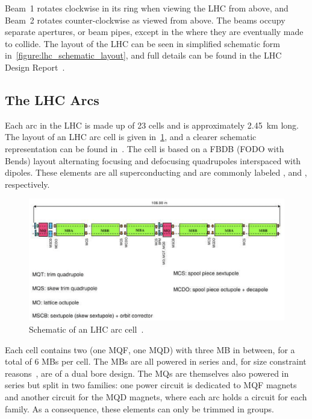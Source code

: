 Beam~\num{1} rotates clockwise in its ring when viewing the LHC from above, and Beam~\num{2} rotates counter-clockwise as viewed from above.
The beams occupy separate apertures, or beam pipes, except in the \IRs where they are eventually made to collide.
The layout of the LHC can be seen in simplified schematic form in~\cref{figure:lhc_schematic_layout}, and full details can be found in the LHC Design Report~\cite{BOOK:Bruning:LHC_Design_Report_Main_Ring,BOOK:Bruning:LHC_Design_Report_Infrastructure,BOOK:Benedikt:LHC_Design_Report_Injector_Chain}.

\subsection{The LHC Arcs}
\label{subsection:lhc_arcs}

Each arc in the LHC is made up of 23 cells and is approximately \qty{2.45}{\kilo\meter} long.
The layout of an LHC arc cell is given in~\cref{figure:lhc_schematic_arc_cell}, and a clearer schematic representation can be found in~\cite{MASTERS:Keintzel:Arc_Cell_Options_HELHC}.
The cell is based on a FBDB (FODO with Bends) layout alternating focusing and defocusing quadrupoles interspaced with dipoles.
These elements are all superconducting and are commonly labeled ,  and , respectively.

\begin{figure}[!hbt]
  \centering
  \includegraphics*[width=0.99\linewidth]{Figures/Optics_Measurements_Corrections_at_LHC/lhc_schematic_arc_cell.png}
  \caption{Schematic of an LHC arc cell~\cite{BOOK:Bruning:LHC_Design_Report_Main_Ring}.}
  \label{figure:lhc_schematic_arc_cell}
\end{figure}

Each cell contains two  (one MQF, one MQD) with three MB in between, for a total of 6 MBs per cell.
The MBs are all powered in series and, for size constraint reasons~\cite{BOOK:Bruning:LHC_Design_Report_Main_Ring}, are of a dual bore design.
The MQs are themselves also powered in series but split in two families: one power circuit is dedicated to MQF magnets and another circuit for the MQD magnets, where each arc holds a circuit for each family.
As a consequence, these elements can only be trimmed in groups.

